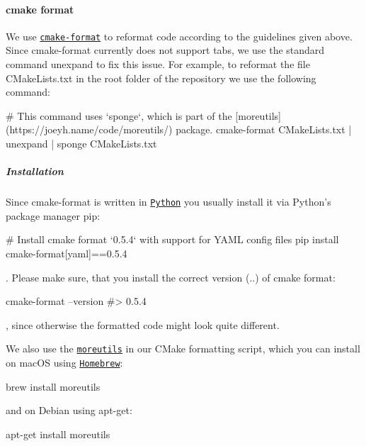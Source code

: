 \paragraph*{cmake format}

We use \href{https://github.com/cheshirekow/cmake_format}{\tt {\ttfamily cmake-\/format}} to reformat code according to the guidelines given above. Since {\ttfamily cmake-\/format} currently does not support tabs, we use the standard command {\ttfamily unexpand} to fix this issue. For example, to reformat the file {\ttfamily C\+Make\+Lists.\+txt} in the root folder of the repository we use the following command\+:


\begin{DoxyCode}
# This command uses `sponge`, which is part of the [moreutils](https://joeyh.name/code/moreutils/) package.
cmake-format CMakeLists.txt | unexpand | sponge CMakeLists.txt
\end{DoxyCode}


\subparagraph*{Installation}

Since {\ttfamily cmake-\/format} is written in \href{https://www.python.org}{\tt Python} you usually install it via Python’s package manager {\ttfamily pip}\+:


\begin{DoxyCode}
# Install cmake format `0.5.4` with support for YAML config files
pip install cmake-format[yaml]==0.5.4
\end{DoxyCode}


. Please make sure, that you install the correct version ({..}) of cmake format\+:


\begin{DoxyCode}
cmake-format --version
#> 0.5.4
\end{DoxyCode}


, since otherwise the formatted code might look quite different.

We also use the \href{https://joeyh.name/code/moreutils}{\tt moreutils} in our C\+Make formatting script, which you can install on mac\+OS using \href{https://brew.sh}{\tt Homebrew}\+:


\begin{DoxyCode}
brew install moreutils
\end{DoxyCode}


and on Debian using {\ttfamily apt-\/get}\+:


\begin{DoxyCode}
apt-get install moreutils
\end{DoxyCode}


